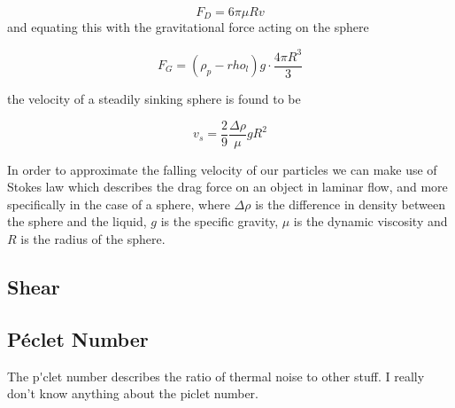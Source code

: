 \begin{equation}
F_D = 6\pi \mu R v
\end{equation}
and equating this with the gravitational force acting on the sphere

\begin{equation}
F_G = (\rho_p - rho_l) g\cdot \frac{4\pi R^3}{3}
\end{equation}

the velocity of a steadily sinking sphere is found to be 

\begin{equation}\label{eq:fallingSphere}
v_s = \frac{2}{9} \frac{\Delta \rho}{\mu} g R^2
\end{equation}

In order to approximate the falling velocity of our particles we can make use of Stokes law which describes the drag force on an object in laminar flow, and more specifically in the case of a sphere, 
where $\Delta\rho$ is the difference in density between the sphere and the liquid, $g$ is the specific gravity, $\mu$ is the dynamic viscosity and $R$ is the radius of the sphere.  



\subsection{Shear}

\subsection{P\'{e}clet Number}
The p\'{}clet number describes the ratio of thermal noise to other stuff. I really don't know anything about the piclet number.
